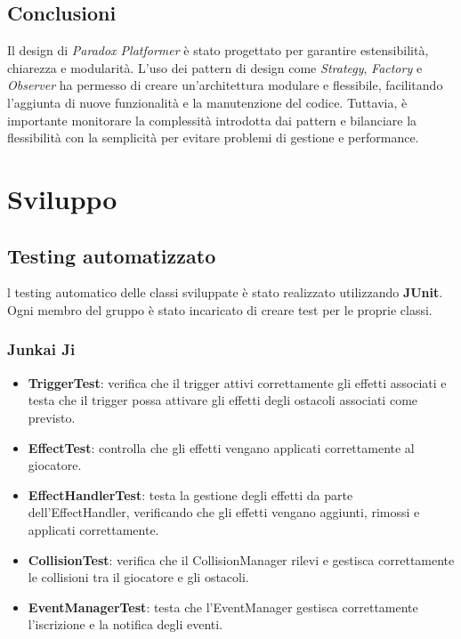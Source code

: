 \documentclass[a4paper,12pt]{report}
\begin{document}
	
	\section{Conclusioni}
	
	Il design di \textit{Paradox Platformer} è stato progettato per garantire estensibilità, chiarezza e modularità. L'uso dei pattern di design come \textit{Strategy}, \textit{Factory} e \textit{Observer} ha permesso di creare un'architettura modulare e flessibile, facilitando l'aggiunta di nuove funzionalità e la manutenzione del codice. Tuttavia, è importante monitorare la complessità introdotta dai pattern e bilanciare la flessibilità con la semplicità per evitare problemi di gestione e performance.
	
	
\chapter{Sviluppo}
\section{Testing automatizzato}

l testing automatico delle classi sviluppate è stato realizzato utilizzando \textbf{JUnit}. Ogni membro del gruppo è stato incaricato di creare test per le proprie classi.

\subsection{Junkai Ji}
\begin{itemize}
\item \textbf{TriggerTest}: verifica che il trigger attivi correttamente gli effetti associati e testa che il trigger possa attivare gli effetti degli ostacoli associati come previsto.

\item \textbf{EffectTest}: controlla che gli effetti vengano applicati correttamente al giocatore.

\item \textbf{EffectHandlerTest}: testa la gestione degli effetti da parte dell’EffectHandler, verificando che gli effetti vengano aggiunti, rimossi e applicati correttamente.

\item \textbf{CollisionTest}: verifica che il CollisionManager rilevi e gestisca correttamente le collisioni tra il giocatore e gli ostacoli.

\item \textbf{EventManagerTest}: testa che l’EventManager gestisca correttamente l’iscrizione e la notifica degli eventi.
\end{itemize}
\end{document}

